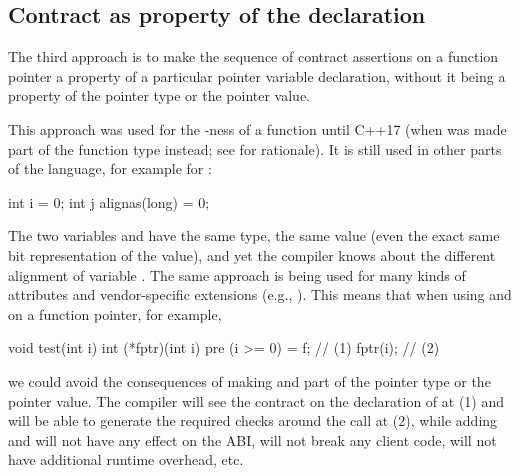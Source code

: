 

\subsection{Contract as property of the declaration}
\label{decl}

The third approach is to make the sequence of contract assertions on a function pointer a property of a particular pointer variable declaration, without it being a property of the pointer type or the pointer value.

This approach was used for the -ness of a function until C++17 (when  was made part of the function type instead; see \cite{P0012R1} for rationale). It is still used in other parts of the language, for example for :
\begin{codeblock}
int i = 0;
int j alignas(long) = 0;
\end{codeblock}
The two variables  and  have the same type, the same value (even the exact same bit representation of the value), and yet the compiler knows about the different alignment of variable . The same approach is being used for many kinds of attributes and vendor-specific extensions (e.g., ). This means that when using   and  on a function pointer, for example,
\begin{codeblock}
void test(int i) {
  int (*fptr)(int i) pre (i >= 0) = f;  // (1)
  fptr(i);  // (2)
}
\end{codeblock}
we could avoid the consequences of making   and  part of the pointer type or the pointer value. The compiler will see the contract on the declaration of  at (1) and will be able to generate the required checks around the call at (2), while adding  and  will not have any effect on the ABI, will not break any client code, will not have additional runtime overhead, etc.

